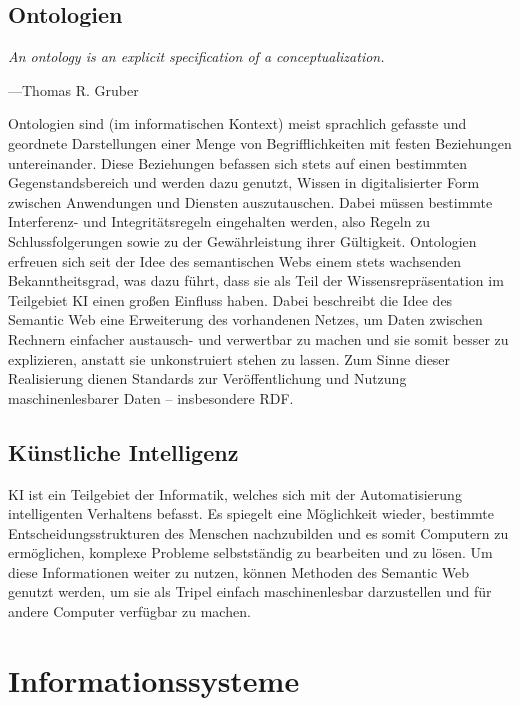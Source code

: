 \documentclass[headsepline,titlepage,ngerman,twoside,12pt]{report}
\newcommand\todo[1]{}%
\begin{document}
\subsection {Ontologien}
\label{sub:ontologien}
\setlength{}
\setlength\epigraphrule{0pt}

\epigraph{\itshape An ontology is an explicit specification of a conceptualization.}{---Thomas R. Gruber\todo{quelle zitieren}}

\noindent Ontologien sind (im informatischen Kontext) meist sprachlich gefasste und geordnete Darstellungen einer Menge von Begrifflichkeiten mit festen Beziehungen untereinander.
Diese Beziehungen befassen sich stets auf einen bestimmten Gegenstandsbereich und werden dazu genutzt, Wissen in digitalisierter Form zwischen Anwendungen und Diensten auszutauschen.
Dabei müssen bestimmte Interferenz- und Integritätsregeln eingehalten werden, also Regeln zu Schlussfolgerungen sowie zu der Gewährleistung ihrer Gültigkeit.
Ontologien erfreuen sich seit der Idee des semantischen Webs einem stets wachsenden Bekanntheitsgrad, was dazu führt, dass sie als Teil der Wissensrepräsentation im Teilgebiet \acs{KI} einen großen Einfluss haben.
Dabei beschreibt die Idee des Semantic Web eine Erweiterung des vorhandenen Netzes, um Daten zwischen Rechnern einfacher austausch- und verwertbar zu machen und sie somit besser zu explizieren, anstatt sie unkonstruiert stehen zu lassen.
Zum Sinne dieser Realisierung dienen Standards zur Veröffentlichung und Nutzung maschinenlesbarer Daten -- insbesondere \ac{RDF}.

\subsection{Künstliche Intelligenz}
\label{sub:ki}

\ac{KI} ist ein Teilgebiet der Informatik, welches sich mit der Automatisierung intelligenten Verhaltens befasst.
Es spiegelt eine Möglichkeit wieder, bestimmte Entscheidungsstrukturen des Menschen nachzubilden und es somit Computern zu ermöglichen, komplexe Probleme selbstständig zu bearbeiten und zu lösen.
Um diese Informationen weiter zu nutzen, können Methoden des Semantic Web genutzt werden, um sie als Tripel einfach maschinenlesbar darzustellen und für andere Computer verfügbar zu machen.

\section{Informationssysteme}
\label{sec:informationssysteme}
\end{document}
